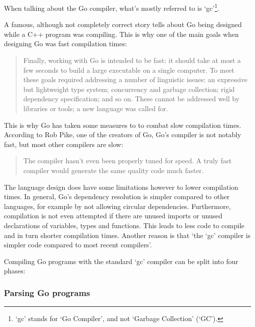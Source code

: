 When talking about the Go compiler, what's mostly referred to is `gc'\footnote{`gc' stands
for `Go Compiler', and not `Garbage Collection' (`GC').}.

A famous, although not completely correct story tells about Go being designed
while a C++ program was compiling\autocite{less-is-more}.
This is why one of the main goals when designing Go was fast compilation times:
\begin{quote}
    Finally, working with Go is intended to be fast: it should take at most a few
    seconds to build a large executable on a single computer. To meet these goals
    required addressing a number of linguistic issues: an expressive but lightweight
    type system; concurrency and garbage collection; rigid dependency specification;
    and so on. These cannot be addressed well by libraries or tools; a new language
    was called for.\autocite{go-faq}
\end{quote}

This is why Go has taken some measures to to combat slow compilation times. According
to Rob Pike, one of the creators of Go, Go's compiler is not notably fast, but
most other compilers are slow:

\begin{quote}
    The compiler hasn't even been properly tuned for speed. A truly fast compiler
    would generate the same quality code much faster.\autocite{nuts-compiler}
\end{quote}

The language design does have some limitations
however to lower compilation times. In general, Go's dependency resolution is simpler
compared to other languages, for example by not allowing circular dependencies.
Furthermore, compilation is not even attempted if there are unused
imports or unused declarations of variables, types and functions.
This leads to less code to compile and in turn shorter compilation times.
Another reason is that `the `gc' compiler is simpler code compared to most
recent compilers'\autocite{nuts-compiler}.

Compiling Go programs with the standard `gc' compiler can be split into four
phases:

\subsubsection{Parsing Go programs}


